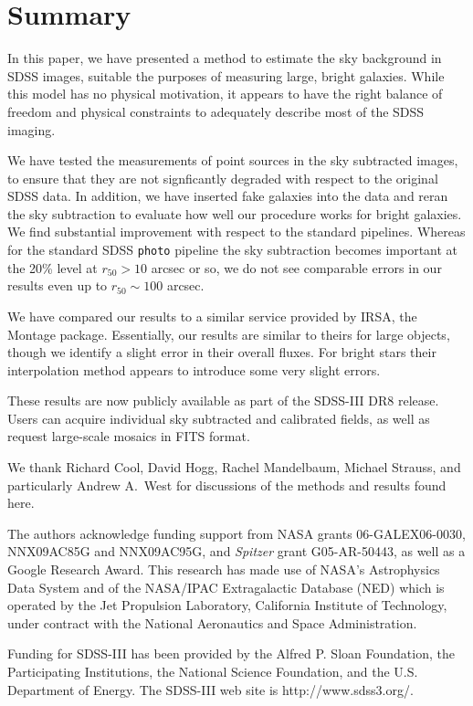 \documentclass[10pt,preprint]{aastex}
\begin{document}
\section{ Summary}
\label{sec:summary}

In this paper, we have presented a method to estimate the sky
background in SDSS images, suitable the purposes of measuring large,
bright galaxies.  While this model has no physical motivation, it
appears to have the right balance of freedom and physical constraints
to adequately describe most of the SDSS imaging.

We have tested the measurements of point sources in the sky subtracted
images, to ensure that they are not signficantly degraded with respect
to the original SDSS data.  In addition, we have inserted fake
galaxies into the data and reran the sky subtraction to evaluate how
well our procedure works for bright galaxies.  We find substantial
improvement with respect to the standard pipelines.  Whereas for the
standard SDSS {\tt photo} pipeline the sky subtraction becomes
important at the 20\% level at $r_{50}>10$ arcsec or so, we do not see
comparable errors in our results even up to $r_{50} \sim 100$ arcsec.

We have compared our results to a similar service provided by IRSA,
the Montage package. Essentially, our results are similar to theirs
for large objects, though we identify a slight error in their overall
fluxes. For bright stars their interpolation method appears to
introduce some very slight errors.

These results are now publicly available as part of the SDSS-III DR8
release. Users can acquire individual sky subtracted and calibrated
fields, as well as request large-scale mosaics in FITS format.

\acknowledgments

We thank Richard Cool, David Hogg, Rachel Mandelbaum, Michael Strauss,
and particularly Andrew A.~West for discussions of the methods and
results found here.

The authors acknowledge funding support from NASA grants
06-GALEX06-0030, NNX09AC85G and NNX09AC95G, and \emph{Spitzer} grant
G05-AR-50443, as well as a Google Research Award. This research has
made use of NASA's Astrophysics Data System and of the NASA/IPAC
Extragalactic Database (NED) which is operated by the Jet Propulsion
Laboratory, California Institute of Technology, under contract with
the National Aeronautics and Space Administration.

Funding for SDSS-III has been provided by the Alfred P. Sloan
Foundation, the Participating Institutions, the National Science
Foundation, and the U.S. Department of Energy. The SDSS-III web site
is http://www.sdss3.org/.
\end{document}
